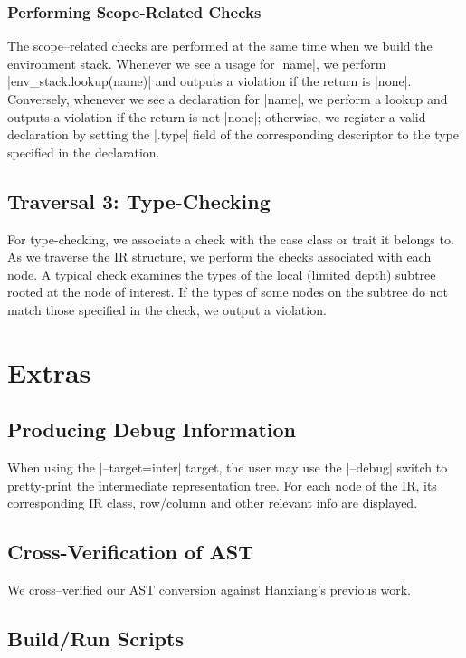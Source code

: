 \subsubsection{Performing Scope-Related Checks}
The scope--related checks are performed at the same time when we build the environment stack. Whenever we see a usage for |name|, we perform |env_stack.lookup(name)| and outputs a violation if the return is |none|. Conversely, whenever we see a declaration for |name|, we perform a lookup and outputs a violation if the return is not |none|; otherwise, we register a valid declaration by setting the |.type| field of the corresponding descriptor to the type specified in the declaration.

\subsection{Traversal 3: Type-Checking}

For type-checking, we associate a check with the case class or trait it belongs to. As we traverse the IR structure, we perform the checks associated with each node. A typical check examines the types of the local (limited depth) subtree rooted at the node of interest. If the types of some nodes on the subtree do not match those specified in the check, we output a violation.

\section{Extras}

\subsection{Producing Debug Information}

When using the |--target=inter| target, the user may use the |--debug| switch to pretty-print the intermediate representation tree. For each node of the IR, its corresponding IR class, row/column and other relevant info are displayed.

\subsection{Cross-Verification of AST}

We cross--verified our AST conversion against Hanxiang's previous work.

\subsection{Build/Run Scripts}

